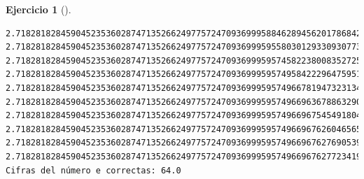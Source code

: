 \documentclass[
  a4paper,
]{scrreport}
\theoremstyle{definition}
\newtheorem{exercise}{Ejercicio}[chapter]
\theoremstyle{remark}
\begin{document}
\begin{exercise}[]
\begin{tcolorbox}
\begin{verbatim}
2.718281828459045235360287471352662497757247093699958846289456201786842269068718, 2.718281828459045235360287471352662497757247093699959558030129330930773409335862, 2.718281828459045235360287471352662497757247093699959574582238008352725296318806, 2.71828182845904523536028747135266249775724709369995957495842229647595147556844, 2.718281828459045235360287471352662497757247093699959574966781947323134279551751, 2.718281828459045235360287471352662497757247093699959574966963678863290427464427, 2.718281828459045235360287471352662497757247093699959574966967545491804388058332, 2.718281828459045235360287471352662497757247093699959574966967626046565095570662, 2.718281828459045235360287471352662497757247093699959574966967627690539803887274, 2.718281828459045235360287471352662497757247093699959574966967627723419298053591]
Cifras del número e correctas: 64.0
\end{verbatim}

\end{tcolorbox}

\end{exercise}
\end{document}
